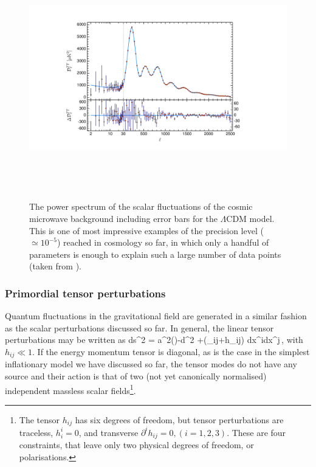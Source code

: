 \begin{figure}[t]
\begin{center}
\includegraphics[width=145mm,height=105mm]{Sections/Figures/CMBSpectrum.pdf} 
\caption{The power spectrum of the scalar fluctuations of the cosmic microwave background including error bars for the $\Lambda$CDM model. This is one of most impressive examples of the precision level ($\simeq 10^{-5}$)  reached in cosmology so far, in which only a handful of parameters is enough to explain such a large number of data points (taken from \cite{Planck:2018vyg}). } \label{Fig:Spectrum} 
\end{center}
\end{figure}


\subsubsection*{Primordial tensor perturbations}

Quantum fluctuations in the gravitational field are generated in a similar fashion as the scalar perturbations discussed so far.
In general, the linear tensor perturbations may be written as
\be
ds^2 = a^2(\eta)\lb -d\eta^2 +(\delta_{ij}+h_{ij}) dx^idx^j\rb\,,
\ee
with $h_{ij}\ll1$. If the energy momentum tensor is diagonal, as is the case in the simplest inflationary model we have discussed so far,  the tensor modes do not have any source and their action is that of two (not yet canonically normalised) independent massless scalar fields\footnote{The tensor $h_{ij}$ has six degrees of freedom, but  tensor perturbations are traceless,  $h^i_i=0$, and transverse $\partial^ih_{ij}=0,  (i = 1,2,3)$. These are four constraints, that leave only  two physical degrees of freedom, or polarisations.}.

